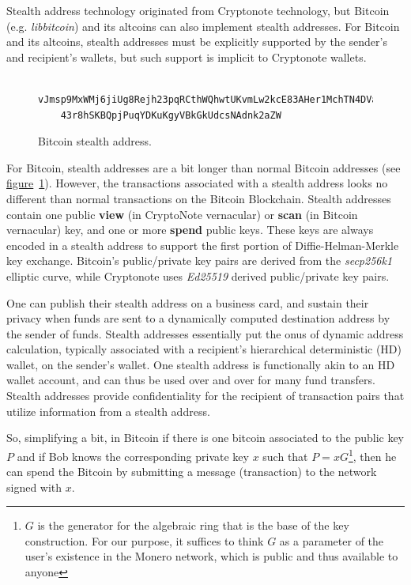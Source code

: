 Stealth address technology originated from Cryptonote technology, but Bitcoin (e.g. \emph{libbitcoin}) and its altcoins can also implement stealth addresses. For Bitcoin and its altcoins, stealth addresses must be explicitly supported by the sender's and recipient's wallets, but such support is implicit to Cryptonote wallets.

\begin{figure}
  \begin{verbatim}
    vJmsp9MxWMj6jiUg8Rejh23pqRCthWQhwtUKvmLw2kcE83AHer1MchTN4DVacHt
    43r8hSKBQpjPuqYDKuKgyVBkGkUdcsNAdnk2aZW
  \end{verbatim}
  \caption{Bitcoin stealth address.}
  \label{fig:btcstealth}
\end{figure}

For Bitcoin, stealth addresses are a bit longer than normal Bitcoin addresses (see \hyperref[fig:btcstealth]{figure}~\ref{fig:btcstealth}). However, the transactions associated with a stealth address looks no different than normal transactions on the Bitcoin Blockchain. Stealth addresses contain one public \textbf{view} (in CryptoNote vernacular) or \textbf{scan} (in Bitcoin vernacular) key, and one or more \textbf{spend} public keys. These keys are always encoded in a stealth address to support the first portion of Diffie-Helman-Merkle key exchange. Bitcoin's public/private key pairs are derived from the \emph{secp256k1} elliptic curve, while Cryptonote uses \emph{Ed25519} derived public/private key pairs.

One can publish their stealth address on a business card, and sustain their privacy when funds are sent to a dynamically computed destination address by the sender of funds. Stealth addresses essentially put the onus of dynamic address calculation, typically associated with a recipient's hierarchical deterministic (HD) wallet, on the sender's wallet. One stealth address is functionally akin to an HD wallet account, and can thus be used over and over for many fund transfers. Stealth addresses provide confidentiality for the recipient of transaction pairs that utilize information from a stealth address.

So, simplifying a bit, in Bitcoin if there is one bitcoin associated to the public key $P$ and if Bob knows the corresponding private key $x$ such that $P = xG$\footnote{$G$ is the generator for the algebraic ring that is the base of the key construction. For our purpose, it suffices to think $G$ as a parameter of the user's existence in the Monero network, which is public and thus available to anyone}, then he can spend the Bitcoin by submitting a message (transaction) to the network signed with $x$.

